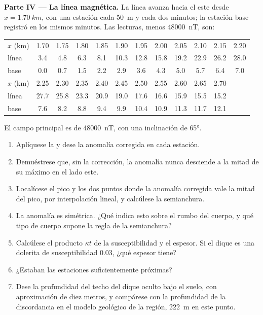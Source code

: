 \begin{problem}
\medskip\noindent\textbf{Parte IV --- La línea magnética.} La línea avanza
hacia el este desde $x = \qty{1.70}{km}$, con una estación cada \qty{50}{m} y
cada dos minutos; la estación base registró en los mismos minutos. Las
lecturas, menos \qty{48000}{nT}, son:
\begin{center}
\small
\setlength{\tabcolsep}{3.5pt}
\begin{tabular}{lccccccccccc}
\hline
$x$ (km) & 1.70 & 1.75 & 1.80 & 1.85 & 1.90 & 1.95 & 2.00 & 2.05 & 2.10 & 2.15 & 2.20 \\
línea & 3.4 & 4.8 & 6.3 & 8.1 & 10.3 & 12.8 & 15.8 & 19.2 & 22.9 & 26.2 & 28.0 \\
base & 0.0 & 0.7 & 1.5 & 2.2 & 2.9 & 3.6 & 4.3 & 5.0 & 5.7 & 6.4 & 7.0 \\
\hline
$x$ (km) & 2.25 & 2.30 & 2.35 & 2.40 & 2.45 & 2.50 & 2.55 & 2.60 & 2.65 & 2.70 & \\
línea & 27.7 & 25.8 & 23.3 & 20.9 & 19.0 & 17.6 & 16.6 & 15.9 & 15.5 & 15.2 & \\
base & 7.6 & 8.2 & 8.8 & 9.4 & 9.9 & 10.4 & 10.9 & 11.3 & 11.7 & 12.1 & \\
\hline
\end{tabular}
\end{center}
El campo principal es de \qty{48000}{nT}, con una inclinación de \ang{65}.
\begin{enumerate}[resume]
  \item Aplíquese la  y dese la anomalía corregida en
  cada estación.
  \item Demuéstrese que, sin la corrección, la anomalía nunca desciende a la
  mitad de su máximo en el lado este.
  \item Localícese el pico y los dos puntos donde la anomalía corregida vale
  la mitad del pico, por interpolación lineal, y calcúlese la semianchura.
  \item La anomalía es simétrica. ¿Qué indica esto sobre el rumbo del
  cuerpo, y qué tipo de cuerpo supone la regla de la semianchura?
  \item Calcúlese el producto $\kappa t$ de la susceptibilidad y el espesor.
  Si el dique es una dolerita de susceptibilidad \num{0.03}, ¿qué espesor
  tiene?
  \item ¿Estaban las estaciones suficientemente próximas?
  \item Dese la profundidad del techo del dique oculto bajo el suelo, con
  aproximación de diez metros, y compárese con la profundidad de la
  discordancia en el modelo geológico de la región, \qty{222}{m} en este
  punto.
\end{enumerate}
\end{problem}
